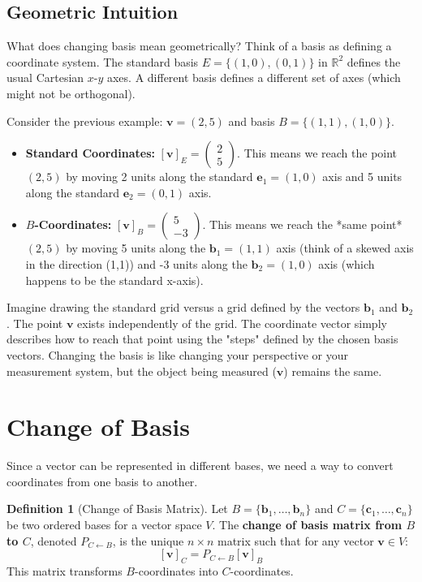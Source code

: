 \documentclass[11pt]{article}
\theoremstyle{definition}
\newtheorem{definition}[theorem]{Definition}
\theoremstyle{remark}
\begin{document}
\subsection{Geometric Intuition}

What does changing basis mean geometrically? Think of a basis as defining a coordinate system. The standard basis $E = \{(1, 0), (0, 1)\}$ in $\mathbb{R}^2$ defines the usual Cartesian $x$-$y$ axes. A different basis defines a different set of axes (which might not be orthogonal).

Consider the previous example: $\mathbf{v} = (2, 5)$ and basis $B = \{(1, 1), (1, 0)\}$.
\begin{itemize}
    \item \textbf{Standard Coordinates:} $[\mathbf{v}]_E = \begin{pmatrix} 2 \\ 5 \end{pmatrix}$. This means we reach the point $(2, 5)$ by moving 2 units along the standard $\mathbf{e}_1 = (1, 0)$ axis and 5 units along the standard $\mathbf{e}_2 = (0, 1)$ axis.
    \item \textbf{$B$-Coordinates:} $[\mathbf{v}]_B = \begin{pmatrix} 5 \\ -3 \end{pmatrix}$. This means we reach the *same point* $(2, 5)$ by moving 5 units along the $\mathbf{b}_1 = (1, 1)$ axis (think of a skewed axis in the direction (1,1)) and -3 units along the $\mathbf{b}_2 = (1, 0)$ axis (which happens to be the standard x-axis).
\end{itemize}
Imagine drawing the standard grid versus a grid defined by the vectors $\mathbf{b}_1$ and $\mathbf{b}_2$. The point $\mathbf{v}$ exists independently of the grid. The coordinate vector simply describes how to reach that point using the "steps" defined by the chosen basis vectors. Changing the basis is like changing your perspective or your measurement system, but the object being measured ($\mathbf{v}$) remains the same.

\section{Change of Basis}

Since a vector can be represented in different bases, we need a way to convert coordinates from one basis to another.

\begin{definition}[Change of Basis Matrix]
Let $B = \{\mathbf{b}_1, \dots, \mathbf{b}_n\}$ and $C = \{\mathbf{c}_1, \dots, \mathbf{c}_n\}$ be two ordered bases for a vector space $V$. The \textbf{change of basis matrix from $B$ to $C$}, denoted $P_{C \leftarrow B}$, is the unique $n \times n$ matrix such that for any vector $\mathbf{v} \in V$:
\[ [\mathbf{v}]_C = P_{C \leftarrow B} [\mathbf{v}]_B \]
This matrix transforms $B$-coordinates into $C$-coordinates.
\end{definition}
\end{document}
